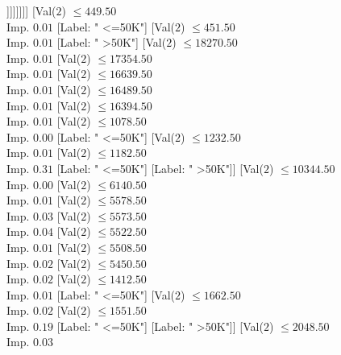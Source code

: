\documentclass[margin=10pt]{standalone}
\begin{document}
\begin{forest}
																		[Label: " <=50K"]
																		[Val($2$) $ \leq 18307.50$ \\ Imp. $1.00$
																			[Label: " >50K"]
																			[Label: " <=50K"]]]]]]]]
												[Val($2$) $ \leq 449.50$ \\ Imp. $0.01$
													[Label: " <=50K"]
													[Val($2$) $ \leq 451.50$ \\ Imp. $0.01$
														[Label: " >50K"]
														[Val($2$) $ \leq 18270.50$ \\ Imp. $0.01$
															[Val($2$) $ \leq 17354.50$ \\ Imp. $0.01$
																[Val($2$) $ \leq 16639.50$ \\ Imp. $0.01$
																	[Val($2$) $ \leq 16489.50$ \\ Imp. $0.01$
																		[Val($2$) $ \leq 16394.50$ \\ Imp. $0.01$
																			[Val($2$) $ \leq 1078.50$ \\ Imp. $0.00$
																				[Label: " <=50K"]
																				[Val($2$) $ \leq 1232.50$ \\ Imp. $0.01$
																					[Val($2$) $ \leq 1182.50$ \\ Imp. $0.31$
																						[Label: " <=50K"]
																						[Label: " >50K"]]
																					[Val($2$) $ \leq 10344.50$ \\ Imp. $0.00$
																						[Val($2$) $ \leq 6140.50$ \\ Imp. $0.01$
																							[Val($2$) $ \leq 5578.50$ \\ Imp. $0.03$
																								[Val($2$) $ \leq 5573.50$ \\ Imp. $0.04$
																									[Val($2$) $ \leq 5522.50$ \\ Imp. $0.01$
																										[Val($2$) $ \leq 5508.50$ \\ Imp. $0.02$
																											[Val($2$) $ \leq 5450.50$ \\ Imp. $0.02$
																												[Val($2$) $ \leq 1412.50$ \\ Imp. $0.01$
																													[Label: " <=50K"]
																													[Val($2$) $ \leq 1662.50$ \\ Imp. $0.02$
																														[Val($2$) $ \leq 1551.50$ \\ Imp. $0.19$
																															[Label: " <=50K"]
																															[Label: " >50K"]]
																														[Val($2$) $ \leq 2048.50$ \\ Imp. $0.03$

\end{forest}
\end{document}

